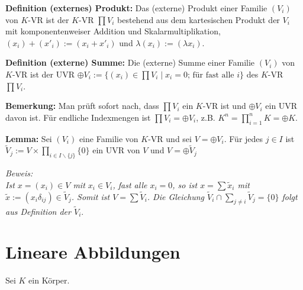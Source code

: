 \documentclass[11pt]{article}
\begin{document}
		\begin{mdframed}[backgroundcolor=blue!20]
			\textbf{Definition (externes) Produkt:} Das (externe) Produkt einer Familie $(V_i)$ von $K$-VR ist der $K$-VR 
			$\prod V_i$ bestehend aus dem kartesischen Produkt der $V_i$ mit komponentenweiser Addition und 
			Skalarmultiplikation, $(x_i)+(x'_i) := (x_i+x'_i)$ und $\lambda(x_i) := (\lambda x_i).$
		\end{mdframed}
		
		\begin{mdframed}[backgroundcolor=blue!20]
			\textbf{Definition (externe) Summe:} Die (externe) Summe einer Familie $(V_i)$ von $K$-VR ist der UVR 
			$\oplus V_i := \{(x_i) \in \prod V_i \mid x_i=0 \text{; für fast alle }i\}$ des $K$-VR $\prod V_i$.
		\end{mdframed}
		
		\textbf{Bemerkung:} Man prüft sofort nach, dass $\prod V_i$ ein $K$-VR ist und $\oplus V_i$ ein UVR davon ist. Für 
		endliche Indexmengen ist $\prod V_i = \oplus V_i$, z.B. $K^n = \prod\limits_{i=1}^n K = \oplus K$. \\
		
		\begin{framed}
			\textbf{Lemma:} Sei $(V_i)$ eine Familie von $K$-VR und sei $V=\oplus V_i$. Für jedes $j\in I$ ist $\tilde V_j :=
			V \times \prod\limits_{i\in I\backslash\{j\}} \{0\}$ ein UVR von $V$ und $V=\oplus \tilde V_j$
		\end{framed}
		\textit{Beweis: \\
		Ist $x=(x_i)\in V$ mit $x_i\in V_i$, fast alle $x_i=0$, so ist $x=\sum \tilde x_i$ mit $\tilde x:=(x_i\delta_{ij})
		\in \tilde V_j$. Somit ist $V=\sum \tilde V_i$. Die Gleichung $\tilde V_i \cap \sum\limits_{j\neq i} \tilde V_j 
		=\{0\}$ folgt aus Definition der $\tilde V_i.$}\\
		
\section{Lineare Abbildungen}
	Sei $K$ ein Körper.
\end{document}

